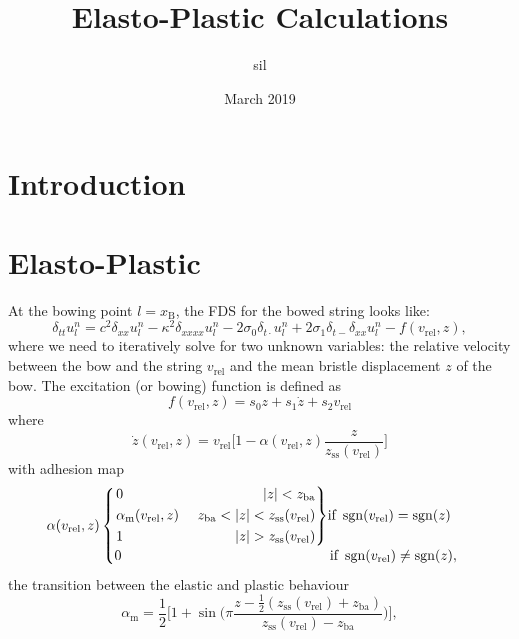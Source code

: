 \documentclass{article}
\title{Elasto-Plastic Calculations}
\author{sil }
\date{March 2019}
\newenvironment{rcases}
  {\left.\begin{alignedat}{2}}
  {\end{alignedat}\right\rbrace}
\DeclareMathOperator{\sgn}{sgn}
\begin{document}
\maketitle

\section{Introduction}
\section{Elasto-Plastic}
At the bowing point $l=x_\text{B}$, the FDS for the bowed string looks like:
\begin{equation}
\label{eq:FDS}
\delta_{tt} u_l^n =c^2 \delta_{xx} u_l^n -\kappa^2\delta_{xxxx} u_l^n - 2\sigma_0\delta_{t\cdot} u_l^n
+ 2\sigma_1\delta_{t-}\delta_{xx}u_l^n - f(v_\text{rel}, z),
\end{equation}
where we need to iteratively solve for two unknown variables: the relative velocity between the bow and the string $v_\text{rel}$ and the mean bristle displacement $z$ of the bow.
The excitation (or bowing) function is defined as
\begin{equation}
    f(v_\text{rel}, z) = s_0z + s_1\dot z + s_2v_\text{rel}
\end{equation}
where 
\begin{equation}\label{eq:zdot}
    \dot z(v_\text{rel}, z) = v_\text{rel}\bigg[1-\alpha(v_\text{rel}, z)\frac{z}{z_\text{ss}(v_\text{rel})}\bigg]
\end{equation}
with adhesion map
\begin{equation}
\alpha(v_\text{rel}, z) 
    \begin{cases}
    \begin{rcases}
        &0 & |z| < z_\text{ba}\\
       &\alpha_\text{m}(v_\text{rel},z)&\quad \  z_\text{ba}<|z|<z_\text{ss}(v_\text{rel})\\
        &1 &|z|>z_\text{ss}(v_\text{rel})
        \end{rcases}\text{if}\  \sgn(v_\text{rel})=\sgn(z)\\
        0\qquad \qquad \qquad \qquad \qquad \qquad \qquad\ \ \; \text{if}\  \sgn(v_\text{rel})\neq\sgn(z),
    \end{cases}
\end{equation}
the transition between the elastic and plastic behaviour
\begin{equation}
    \alpha_\text{m} = \frac{1}{2}\bigg[1+\sin\bigg(\pi\frac{z-\frac{1}{2}(z_\text{ss}(v_\text{rel})+z_\text{ba})}{z_\text{ss}(v_\text{rel})-z_\text{ba}}\bigg)\bigg],
\end{equation}
\end{document}
